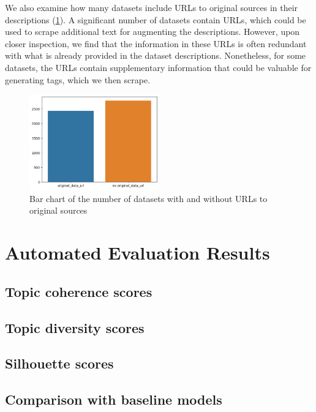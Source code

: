 We also examine how many datasets include URLs to original sources in their descriptions (\cref{fig:original_data_url_vs_no}). A significant number of datasets contain URLs, which could be used to scrape additional text for augmenting the descriptions. However, upon closer inspection, we find that the information in these URLs is often redundant with what is already provided in the dataset descriptions. Nonetheless, for some datasets, the URLs contain supplementary information that could be valuable for generating tags, which we then scrape.

\begin{figure}[h]
    \centering
    \includegraphics[width=0.5\textwidth]{figures/original_data_url_vs_no.png}
    \caption{Bar chart of the number of datasets with and without URLs to original sources}
    \label{fig:original_data_url_vs_no}
\end{figure}

\section{Automated Evaluation Results}
\subsection{Topic coherence scores}

\subsection{Topic diversity scores}

\subsection{Silhouette scores}

\subsection{Comparison with baseline models}

